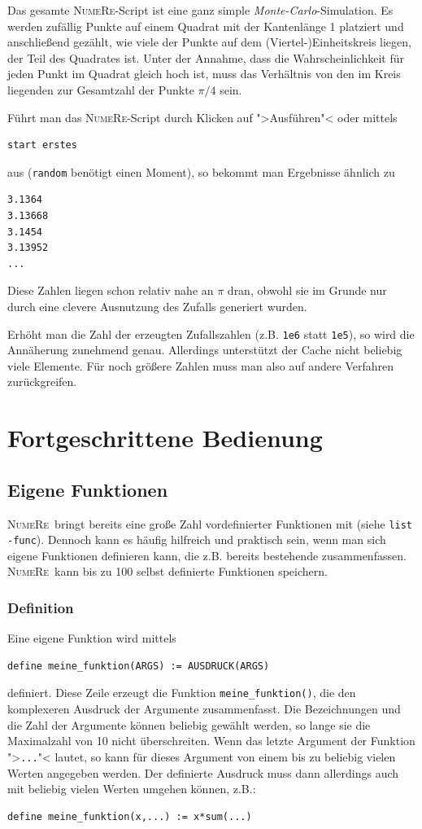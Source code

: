\documentclass[DIV=14,headsepline,footsepline]{scrbook}
\newcommand{\NR}{\textsc{Nu\-me\-Re}}
\begin{document}
				Das gesamte \NR-Script ist eine ganz simple \emph{Monte-Carlo}-Simulation. Es werden zufällig Punkte auf einem Quadrat mit der Kantenlänge 1 platziert und anschließend gezählt, wie viele der Punkte auf dem (Viertel-)Einheitskreis liegen, der Teil des Quadrates ist. Unter der Annahme, dass die Wahrscheinlichkeit für jeden Punkt im Quadrat gleich hoch ist, muss das Verhältnis von den im Kreis liegenden zur Gesamtzahl der Punkte $\pi/4$ sein.
				
				Führt man das \NR-Script durch Klicken auf ">Ausführen"< oder mittels
				\begin{lstlisting}
start erstes
				\end{lstlisting}
				aus (\lstinline+random+ benötigt einen Moment), so bekommt man Ergebnisse ähnlich zu
				\begin{lstlisting}
3.1364
3.13668
3.1454
3.13952
...
				\end{lstlisting}
				Diese Zahlen liegen schon relativ nahe an $\pi$ dran, obwohl sie im Grunde nur durch eine clevere Ausnutzung des Zufalls generiert wurden.
				
				Erhöht man die Zahl der erzeugten Zufallszahlen (z.B. \lstinline+1e6+ statt \lstinline+1e5+), so wird die Annäherung zunehmend genau. Allerdings unterstützt der Cache nicht beliebig viele Elemente. Für noch größere Zahlen muss man also auf andere Verfahren zurückgreifen.
	\part{Fortgeschrittene Bedienung}
		\chapter{Eigene Funktionen}
			\NR\ bringt bereits eine große Zahl vordefinierter Funktionen mit (siehe \lstinline+list -func+). Dennoch kann es häufig hilfreich und praktisch sein, wenn man sich eigene Funktionen definieren kann, die z.B. bereits bestehende zusammenfassen. \NR\ kann bis zu 100 selbst definierte Funktionen speichern.
			\section{Definition}
				Eine eigene Funktion wird mittels
				\begin{lstlisting}
define meine_funktion(ARGS) := AUSDRUCK(ARGS)
				\end{lstlisting}
				definiert. Diese Zeile erzeugt die Funktion \lstinline+meine_funktion()+, die den komplexeren Ausdruck der Argumente zusammenfasst. Die Bezeichnungen und die Zahl der Argumente können beliebig gewählt werden, so lange sie die Maximalzahl von 10 nicht überschreiten. Wenn das letzte Argument der Funktion ">\lstinline+...+"< lautet, so kann für dieses Argument von einem bis zu beliebig vielen Werten angegeben werden. Der definierte Ausdruck muss dann allerdings auch mit beliebig vielen Werten umgehen können, z.B.:
				\begin{lstlisting}
define meine_funktion(x,...) := x*sum(...)
				\end{lstlisting}
				
\end{document}
